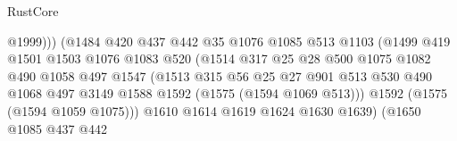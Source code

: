 \begin{lexlean}{RustCore}
\begin{coremodule}
                                          @1999)))
                                    (@1484
                                      @420
                                      @437
                                      @442
                                      @35
                                      @1076
                                      @1085
                                      @513
                                      @1103
                                      (@1499
                                        @419
                                        @1501
                                        @1503
                                        @1076
                                        @1083
                                        @520
                                        (@1514
                                          @317
                                          @25
                                          @28
                                          @500
                                          @1075
                                          @1082
                                          @490
                                          @1058
                                          @497
                                          @1547
                                          (@1513
                                            @315
                                            @56
                                            @25
                                            @27
                                            @901
                                            @513
                                            @530
                                            @490
                                            @1068
                                            @497
                                            @3149
                                            @1588
                                            @1592
                                            (@1575 (@1594 @1069 @513)))
                                          @1592
                                          (@1575 (@1594 @1059 @1075)))
                                        @1610
                                        @1614
                                        @1619
                                        @1624
                                        @1630
                                        @1639)
                                      (@1650
                                        @1085
                                        @437
                                        @442

\end{coremodule}
\end{lexlean}
